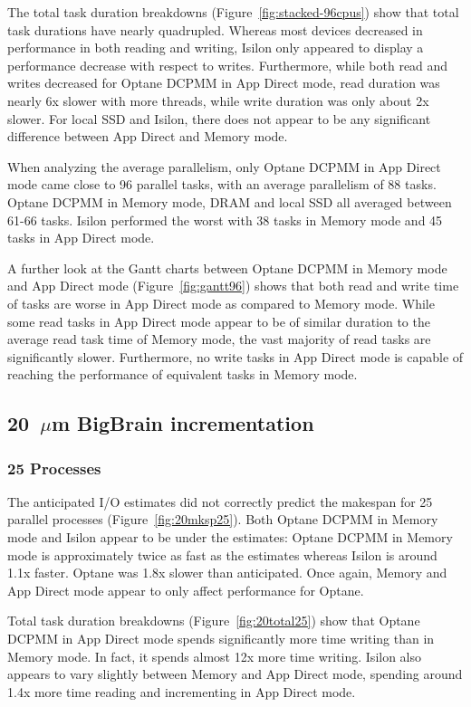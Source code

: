 \documentclass[conference]{IEEEtran}
\newcommand{\bigbrain}{BigBrain\xspace}
\begin{document}
The total task duration breakdowns (Figure~\ref{fig:stacked-96cpus}) show that total task durations
have nearly quadrupled. Whereas most devices decreased in performance in both reading and writing,
Isilon only appeared to display a performance decrease with respect to writes. Furthermore, while both
read and writes decreased for Optane DCPMM in App Direct mode, read duration was nearly 6x slower with more threads,
while write duration was only about 2x slower. For local SSD and Isilon, there does not appear to 
be any significant difference between App Direct and Memory mode.

When analyzing the average parallelism, only Optane DCPMM in App Direct mode
came close to 96 parallel tasks, with an average parallelism of 88 tasks. Optane DCPMM in Memory mode,
DRAM and local SSD all averaged between 61-66 tasks. Isilon performed the worst with 38 tasks in Memory 
mode and 45 tasks in App Direct mode.

A further look at the Gantt charts between Optane DCPMM in Memory mode and App Direct mode (Figure~\ref{fig:gantt96})
shows that both read and write time of tasks are worse in App Direct mode as compared to Memory mode.
While some read tasks in App Direct mode appear to be of similar duration to the average read task time
of Memory mode, the vast majority of read tasks are significantly slower. Furthermore, no write tasks in App
Direct mode is capable of reaching the performance of equivalent tasks in Memory mode.

\subsection{20~$\mu$m \bigbrain incrementation}
\subsubsection{25 Processes}

The anticipated I/O estimates did not correctly predict the makespan for 25 parallel
processes (Figure~\ref{fig:20mksp25}). Both Optane DCPMM in Memory mode and Isilon appear 
to be under the estimates: Optane DCPMM in Memory mode is approximately twice as fast as the
estimates whereas Isilon is around 1.1x faster. Optane was 1.8x slower than anticipated.
Once again, Memory and App Direct mode appear to only affect performance for Optane.

Total task duration breakdowns (Figure~\ref{fig:20total25}) show that Optane DCPMM in
App Direct mode spends significantly more time writing than in Memory mode.
In fact, it spends almost 12x more time writing. Isilon also appears to vary slightly
between Memory and App Direct mode, spending around 1.4x more time reading and incrementing
in App Direct mode. 
\end{document}
